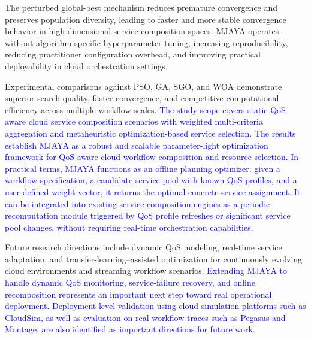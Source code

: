 \documentclass[3p,twocolumn]{elsarticle}
\theoremstyle{thmstyleone}%
\theoremstyle{thmstyletwo}%
\theoremstyle{thmstylethree}%
\begin{document}
The perturbed global-best mechanism reduces premature convergence and preserves population diversity, leading to faster and more stable convergence behavior in high-dimensional service composition spaces. MJAYA operates without algorithm-specific hyperparameter tuning, increasing reproducibility, reducing practitioner configuration overhead, and improving practical deployability in cloud orchestration settings.

Experimental comparisons against PSO, GA, SGO, and WOA demonstrate superior search quality, faster convergence, and competitive computational efficiency across multiple workflow scales.
\textcolor{blue}{ The study scope covers static QoS-aware cloud service composition scenarios with weighted multi-criteria aggregation and metaheuristic optimization-based service selection. 
The results establish MJAYA as a robust and scalable parameter-light optimization framework for QoS-aware cloud workflow composition and resource selection. In practical terms, MJAYA functions as an offline planning optimizer: given a workflow specification, a candidate service pool with known QoS profiles, and a user-defined weight vector, it returns the optimal concrete service assignment. It can be integrated into existing service-composition engines as a periodic recomputation module 
triggered by QoS profile refreshes or significant service pool changes, without requiring real-time orchestration capabilities.}

Future research directions include dynamic QoS modeling, real-time service adaptation, and transfer-learning--assisted optimization for continuously evolving cloud environments and streaming workflow 
scenarios. \textcolor{blue}{Extending MJAYA to handle dynamic QoS monitoring, service-failure recovery, and online recomposition represents an important next step toward real operational 
deployment. Deployment-level validation using cloud simulation platforms such as CloudSim, as well as evaluation on real workflow traces such as Pegasus and Montage, are also identified as important directions for future work.}

   	
 
 
 \clearpage
 
 
\end{document}
